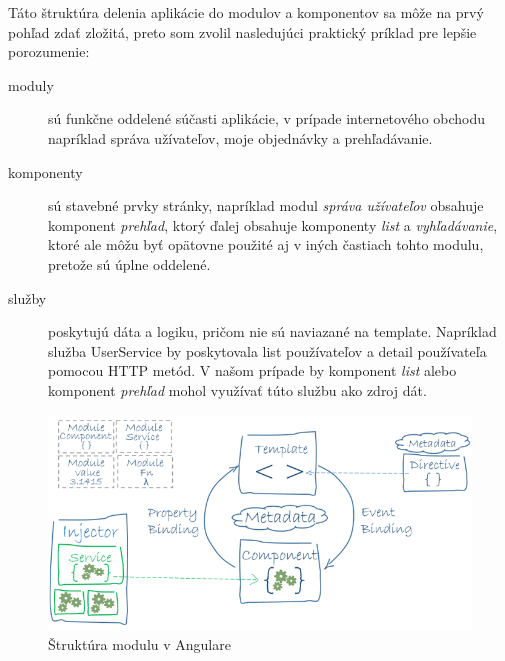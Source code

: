 \documentclass[
  digital, %
  twoside, %
  notable,   %
  nolof,   %
  nolot,   %
]{fithesis3}
\begin{document}
Táto štruktúra delenia aplikácie do modulov a komponentov sa môže na prvý pohľad zdať zložitá, preto som zvolil nasledujúci praktický príklad pre lepšie porozumenie:
\begin{description}
\item[moduly] sú funkčne oddelené súčasti aplikácie, v prípade internetového obchodu napríklad správa užívateľov, moje objednávky a prehľadávanie.
\item[komponenty] sú stavebné prvky stránky, napríklad modul \textit{správa užívateľov} obsahuje komponent \textit{prehľad}, ktorý ďalej obsahuje komponenty \textit{list} a \textit{vyhľadávanie}, ktoré ale môžu byť opätovne použité aj v iných častiach tohto modulu, pretože sú úplne oddelené.
\item[služby] poskytujú dáta a logiku, pričom nie sú naviazané na template. Napríklad služba UserService by poskytovala list používateľov a detail používateľa pomocou HTTP metód. V našom prípade by komponent \textit{list} alebo komponent \textit{prehľad} mohol využívať túto službu ako zdroj dát.
\end{description}

\begin{figure}[H]
	\center
	\includegraphics[width=1.0\linewidth]{angular_architecture}
	\caption{Štruktúra modulu v Angulare\cite{angular}}
	\label{angular_architecture}
\end{figure}
\end{document}
